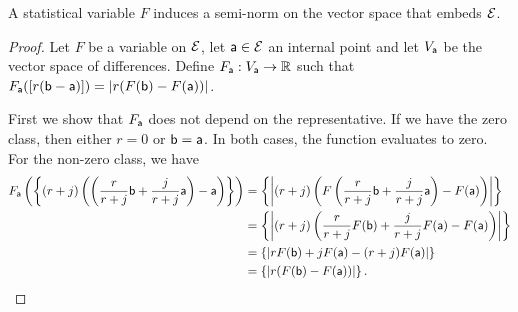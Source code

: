 \begin{prop}
	A statistical variable $F$ induces a semi-norm on the vector space that embeds $\Ens$.
\end{prop}

\begin{proof}
	Let $F$ be a variable on $\Ens$, let $\ens[a] \in \Ens$ an internal point and let $V_{\ens[a]}$ be the vector space of differences. Define $F_{\ens[a]} : V_{\ens[a]} \to \mathbb{R}$ such that $F_{\ens[a]}([r(\ens[b]-\ens[a])]) = |r (F(\ens[b]) - F(\ens[a]))|$.
	
	First we show that $F_{\ens[a]}$ does not depend on the representative. If we have the zero class, then either $r=0$ or $\ens[b] = \ens[a]$. In both cases, the function evaluates to zero. For the non-zero class, we have
	\begin{equation}
		\begin{aligned}
			F_{\ens[a]}\left(\left\{(r+j)\left(\left(\frac{r}{r+j}\ens[b] +\frac{j}{r+j} \ens[a]\right) -\ens[a]\right)\right\}\right) &= \left\{ \left|(r+j)\left(F\left(\frac{r}{r+j}\ens[b] +\frac{j}{r+j} \ens[a]\right) - F(\ens[a]) \right)\right| \right\} \\
			&= \left\{ \left|(r+j)\left(\frac{r}{r+j}F(\ens[b]) +\frac{j}{r+j} F(\ens[a]) - F(\ens[a]) \right)\right| \right\} \\
			&= \left\{ \left| r F(\ens[b]) + j F(\ens[a]) - (r+j) F(\ens[a]) \right| \right\} \\
			&= \left\{|r (F(\ens[b]) - F(\ens[a]))|\right\}.
		\end{aligned}
	\end{equation}
	

\end{proof}
